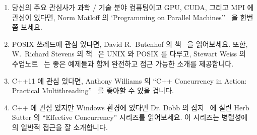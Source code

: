 \begin{enumerate}
\item	당신의 주요 관심사가 과학 / 기술 분야 컴퓨팅이고 GPU, CUDA, 그리고 MPI
	에 관심이 있다면, Norm Matloff 의 `Programming on Parallel
	Machines''~\cite{NormMatloff2013ParProcBook} 을 한번쯤 보세요.

\iffalse
\item	If your primary focus is scientific and technical computing,
	and you are interested in GPUs, CUDA, and MPI, you
	might check out Norm Matloff's ``Programming on
	Parallel Machines''~\cite{NormMatloff2013ParProcBook}.
\fi

\item	POSIX 쓰레드에 관심 있다면, David R.~Butenhof 의
	책~\cite{Butenhof1997pthreads} 을 읽어보세요.  또한, W.~Richard Stevens
	의 책~\cite{WRichardStevens1992} 은 UNIX 와 POSIX 를 다루고, Stewart
	Weiss 의 수업노트~\cite{StewartWeiss2013UNIX} 는 좋은 예제들과 함께
	완전하고 접근 가능한 소개를 제공합니다.

\iffalse
\item	If you are interested in POSIX Threads, you might take
	a look at David R.~Butenhof's book~\cite{Butenhof1997pthreads}.
	In addition,
	W.~Richard Stevens's book~\cite{WRichardStevens1992}
	covers UNIX and POSIX, and Stewart Weiss's lecture
	notes~\cite{StewartWeiss2013UNIX} provide an
	thorough and accessible introduction with a good set of
	examples.
\fi

\item	C++11 에 관심 있다면, Anthony Williams 의 ``C++ Concurrency in Action:
	Practical Multithreading''~\cite{AnthonyWilliams2012} 를 좋아할 수 있을
	겁니다.

\iffalse
\item	If you are interested in C++11, you might like
	Anthony Williams's ``C++ Concurrency in Action: Practical
	Multithreading''~\cite{AnthonyWilliams2012}.
\fi

\item	C++ 에 관심 있지만 Windows 환경에 있다면 Dr. Dobb 의
	잡지~\cite{HerbSutter2008EffectiveConcurrency} 에 실린 Herb Sutter 의
	``Effective Concurrency'' 시리즈를 읽어보세요.
	이 시리즈는 병렬성에의 일반적 접근을 잘 소개합니다.

\iffalse
\item	If you are interested in C++, but in a Windows environment,
	you might try Herb Sutter's ``Effective Concurrency''
	series in
	Dr. Dobbs Journal~\cite{HerbSutter2008EffectiveConcurrency}.
	This series does a reasonable job of presenting a
	commonsense approach to parallelism.
\fi


\end{enumerate}
